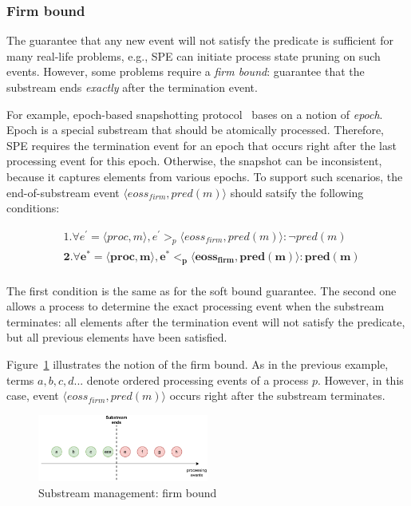 \subsubsection{Firm bound}

The guarantee that any new event will not satisfy the predicate is sufficient for many real-life problems, e.g., SPE can initiate process state pruning on such events. However, some problems require a {\em firm bound}: guarantee that the substream ends {\em exactly} after the termination event. 

For example, epoch-based snapshotting protocol~\cite{2015arXiv150608603C, jacques2016consistent} bases on a notion of {\em epoch}. Epoch is a special substream that should be atomically processed. Therefore, SPE requires the termination event for an epoch that occurs right after the last processing event for this epoch. Otherwise, the snapshot can be inconsistent, because it captures elements from various epochs. To support such scenarios, the end-of-substream event $\langle eoss_{firm}, pred(m)\rangle$ should satsify the following conditions:

\begin{align*}
&1. \forall e^{'} = \langle proc,m\rangle, e^{'} >_p \langle eoss_{firm}, pred(m)\rangle : \neg pred(m) \\
&\boldsymbol{2. \forall e^{*} = \langle proc,m\rangle, e^{*} <_p \langle eoss_{firm}, pred(m)\rangle : pred(m)} \\
\end{align*}

The first condition is the same as for the soft bound guarantee. The second one allows a process to determine the exact processing event when the substream terminates: all elements after the termination event will not satisfy the predicate, but all previous elements have been satisfied. 

Figure~\ref{strict_guarantees} illustrates the notion of the firm bound. As in the previous example, terms $a,b,c,d...$ denote ordered processing events of a process $p$. However, in this case, event $\langle eoss_{firm}, pred(m)\rangle$ occurs right after the substream terminates.

\begin{figure}[htbp]
  \centering
  \includegraphics[width=0.50\textwidth]{pics/strict-guarantee.pdf}
  \caption{Substream management: firm bound}
  \label{strict_guarantees}
\end{figure}

